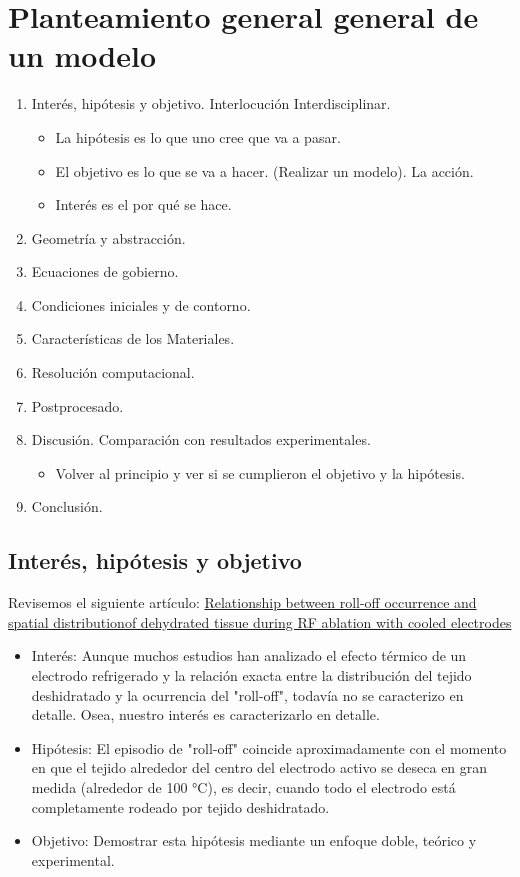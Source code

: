 \section{Planteamiento general general de un modelo}
\begin{enumerate}
    \item Interés, hipótesis y objetivo. Interlocución Interdisciplinar.
	\begin{itemize}
	    \item La hipótesis es lo que uno cree que va a pasar.
	    \item El objetivo es lo que se va a hacer. (Realizar un modelo). La acción. 
	    \item Interés es el por qué se hace.
	\end{itemize}
    \item Geometría y abstracción.
    \item Ecuaciones de gobierno.
    \item Condiciones iniciales y de contorno.
    \item Características de los Materiales.
    \item Resolución computacional.
    \item Postprocesado.
    \item Discusión. Comparación con resultados experimentales.
	\begin{itemize}
	    \item Volver al principio y ver si se cumplieron el objetivo y la hipótesis.
	\end{itemize}
    \item Conclusión.
\end{enumerate}

\subsection{Interés, hipótesis y objetivo}
Revisemos el siguiente artículo: \href{https://doi.org/10.3109/02656736.2011.631076}{Relationship between roll-off occurrence and spatial distributionof dehydrated tissue during RF ablation with cooled electrodes}

\begin{itemize}
	\item Interés: Aunque muchos estudios han analizado el efecto térmico de un electrodo refrigerado y la relación exacta entre la distribución del tejido deshidratado y la ocurrencia del "roll-off", todavía no se caracterizo en detalle. Osea, nuestro interés es caracterizarlo en detalle.
	\item Hipótesis: El episodio de "roll-off" coincide aproximadamente con el momento en que el tejido alrededor del centro del electrodo activo se deseca en gran medida (alrededor de 100 °C), es decir, cuando todo el electrodo está completamente rodeado por tejido deshidratado.
	\item Objetivo: Demostrar esta hipótesis mediante un enfoque doble, teórico y experimental.
\end{itemize}

